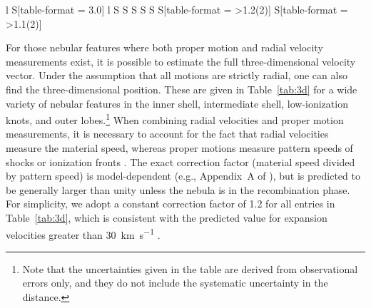 \documentclass[useAMS, usenatbib]{mnras}
\begin{document}
\begin{table}
\begin{tabular}{
    l %
    S[table-format = 3.0] %
    l %
    S %
    S %
    S %
    S %
    S %
    S[table-format = >1.2(2)] %
    S[table-format = >1.1(2)] %
    }
    \bottomrule
  \end{tabular}
\end{table}

For those nebular features where both proper motion and radial velocity measurements exist,
it is possible to estimate the full three-dimensional velocity vector.
Under the assumption that all motions are strictly radial,
one can also find the three-dimensional position.
These are given in Table~\ref{tab:3d} for a wide variety of nebular features
in the inner shell, intermediate shell, low-ionization knots, and outer lobes.\footnote{
  Note that the uncertainties given in the table are derived from observational errors only,
  and they do not include the systematic uncertainty in the distance.
}
When combining radial velocities and proper motion measurements,
it is necessary to account for the fact that radial velocities measure the material speed,
whereas proper motions measure pattern speeds of shocks or ionization fronts \citep{Mellema:2004a}. 
The exact correction factor (material speed divided by pattern speed)
is model-dependent (e.g., Appendix~A of \citealp{ODell:2009c}),
but is predicted to be generally larger than unity
\citetext{see Fig.~8 of \citealp{Jacob:2013a}}
unless the nebula is in the recombination phase.
For simplicity, we adopt a constant correction factor of 1.2 for all entries in Table~\ref{tab:3d},
which is consistent with the predicted value for expansion velocities greater than \SI{30}{km.s^{-1}}
\citetext{see Fig.~3 of \citealp{Schonberner:2019a}}.
\end{document}
